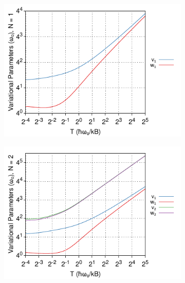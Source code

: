 \begin{figure}[!tbp]
  \label{fig:multivwalpha}
\end{figure}

\begin{figure}[!tbp]
    \centering
  \begin{subfigure}[b]{0.49\textwidth}
    \centering
    \includegraphics[width=\textwidth]{figures/frohlich-3d-multivariate-vw-alpha-7-temp-00325to32-N-1-COLOUR.pdf}
  \end{subfigure}
  \begin{subfigure}[b]{0.49\textwidth}
    \centering
    \includegraphics[width=\textwidth]{figures/frohlich-3d-multivariate-vw-alpha-7-temp-00325to32-N-2-COLOUR.pdf}
  \end{subfigure}
  \begin{subfigure}[b]{0.49\textwidth}

\end{subfigure}
\end{figure}
